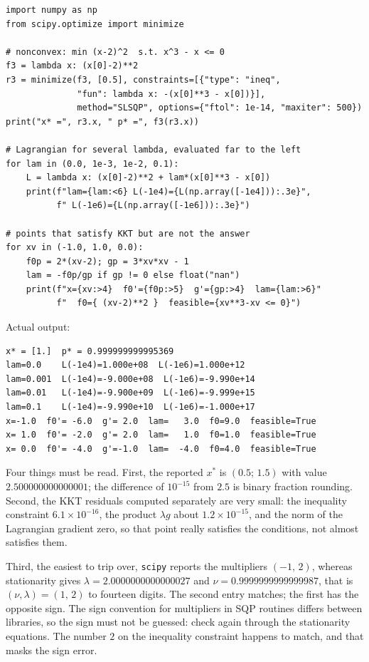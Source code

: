 \begin{lab}
\begin{verbatim}
import numpy as np
from scipy.optimize import minimize

# nonconvex: min (x-2)^2  s.t. x^3 - x <= 0
f3 = lambda x: (x[0]-2)**2
r3 = minimize(f3, [0.5], constraints=[{"type": "ineq",
              "fun": lambda x: -(x[0]**3 - x[0])}],
              method="SLSQP", options={"ftol": 1e-14, "maxiter": 500})
print("x* =", r3.x, " p* =", f3(r3.x))

# Lagrangian for several lambda, evaluated far to the left
for lam in (0.0, 1e-3, 1e-2, 0.1):
    L = lambda x: (x[0]-2)**2 + lam*(x[0]**3 - x[0])
    print(f"lam={lam:<6} L(-1e4)={L(np.array([-1e4])):.3e}",
          f" L(-1e6)={L(np.array([-1e6])):.3e}")

# points that satisfy KKT but are not the answer
for xv in (-1.0, 1.0, 0.0):
    f0p = 2*(xv-2); gp = 3*xv*xv - 1
    lam = -f0p/gp if gp != 0 else float("nan")
    print(f"x={xv:>4}  f0'={f0p:>5}  g'={gp:>4}  lam={lam:>6}"
          f"  f0={ (xv-2)**2 }  feasible={xv**3-xv <= 0}")
\end{verbatim}
Actual output:
\begin{verbatim}
x* = [1.]  p* = 0.999999999995369
lam=0.0    L(-1e4)=1.000e+08  L(-1e6)=1.000e+12
lam=0.001  L(-1e4)=-9.000e+08  L(-1e6)=-9.990e+14
lam=0.01   L(-1e4)=-9.900e+09  L(-1e6)=-9.999e+15
lam=0.1    L(-1e4)=-9.990e+10  L(-1e6)=-1.000e+17
x=-1.0  f0'= -6.0  g'= 2.0  lam=   3.0  f0=9.0  feasible=True
x= 1.0  f0'= -2.0  g'= 2.0  lam=   1.0  f0=1.0  feasible=True
x= 0.0  f0'= -4.0  g'=-1.0  lam=  -4.0  f0=4.0  feasible=True
\end{verbatim}
\end{lab}

Four things must be read. First, the reported $x^{*}$ is $(0.5;\,1.5)$ with value
$2.500000000000001$; the difference of $10^{-15}$ from $2.5$ is binary fraction rounding.
Second, the KKT residuals computed separately are very small: the inequality constraint
$6.1\times10^{-16}$, the product $\lambda g$ about $1.2\times10^{-15}$, and the norm of the
Lagrangian gradient zero, so that point really satisfies the conditions, not almost satisfies
them.

Third, the easiest to trip over, \texttt{scipy} reports the multipliers $(-1,\,2)$, whereas
stationarity gives $\lambda=2.0000000000000027$ and $\nu=0.9999999999999987$, that is
$(\nu,\lambda)=(1,\,2)$ to fourteen digits. The second entry matches; the first has the opposite
sign. The sign convention for multipliers in SQP routines differs between libraries, so the sign
must not be guessed: check again through the stationarity equations. The number $2$ on the
inequality constraint happens to match, and that masks the sign error.

